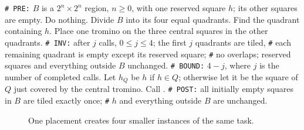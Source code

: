 \begin{algorithm}[H]
\begin{algorithmic}[1]
\Statex \texttt{\# PRE:} $B$ is a $2^n\times2^n$ region, $n\geq0$, with one reserved square
$h$; its other squares are empty.
\State Do nothing.
\Else
\State Divide $B$ into its four equal quadrants.
\State Find the quadrant containing $h$.
\State Place one tromino on the three central squares in the other quadrants.
\Statex \texttt{\# INV:} after $j$ calls, $0\leq j\leq4$; the first $j$ quadrants are tiled,
\Statex \texttt{\#} each remaining quadrant is empty except its reserved square;
\Statex \texttt{\#} no overlaps; reserved squares and everything outside $B$ unchanged.
\Statex \texttt{\# BOUND:} $4-j$, where $j$ is the number of completed calls.
\State Let $h_Q$ be $h$ if $h\in Q$; otherwise let it be the square of $Q$ just covered by the central tromino.
\State Call .
\EndFor
\EndIf
\Statex \texttt{\# POST:} all initially empty squares in $B$ are tiled exactly once;
\Statex \texttt{\#} $h$ and everything outside $B$ are unchanged.
\EndProcedure
\end{algorithmic}
\caption{The inductive tiling construction as a procedure that places tiles.}
\end{algorithm}

\begin{figure}[ht]
\centering
{}
\caption{One placement creates four smaller instances of the same task.}
\end{figure}

